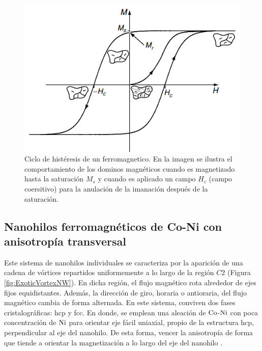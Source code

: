 \begin{figure}[!htp]
    \centering
    \includegraphics[scale=0.5]{Figuras/Hysteresis.png}
    \renewcommand{\figurename}{\textbf{Figura}}
    \renewcommand\thefigure{\textbf{\arabic{figure}}}
    \caption{Ciclo de histéresis de un ferromagnetico. En la imagen se ilustra el comportamiento de los dominos magnéticos cuando es magnetizado hasta la saturación $M_s$ y cuando es aplicado un campo $H_c$ (campo coersitivo) para la anulación de la imanación después de la saturación\cite{coey_2010}.}
    \label{fig:hysteresis}
\end{figure}

\subsection{Nanohilos ferromagnéticos de Co-Ni con anisotropía transversal}
Este sistema de nanohilos individuales se caracteriza por la aparición de una cadena de vórtices repartidos uniformemente a lo largo de la región $C2$ (Figura \ref{fig:ExoticVortexNW}). En dicha región, el flujo magnético rota alrededor de ejes fijos equidistantes. Además, la dirección de giro, horaria o antioraria, del flujo magnético cambia de forma alternada. En este sistema, conviven dos fases cristalográficas: hcp y fcc. En donde, se emplean una aleación de $\ce{Co}$-$\ce{Ni}$ con poca concentración de $\ce{Ni}$ para orientar eje fácil uniaxial, propio de la estructura hcp, perpendicular al eje del nanohilo. De esta forma, vencer la anisotropía de forma que tiende a orientar la magnetización a lo largo del eje del nanohilo \cite{ExoticMagneticConfiguration}.

